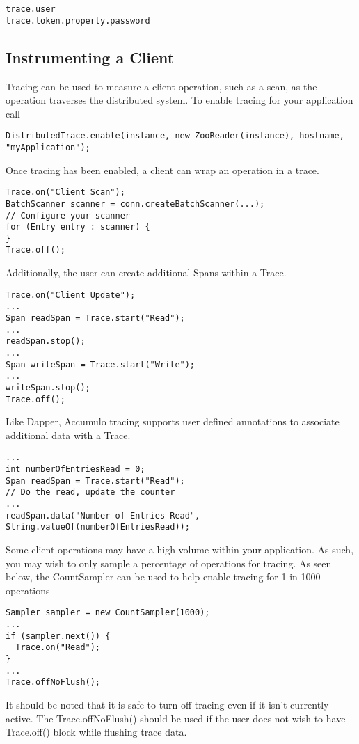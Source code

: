 \begin{verbatim}
trace.user
trace.token.property.password
\end{verbatim}

\subsection{Instrumenting a Client}
Tracing can be used to measure a client operation, such as a scan, as
the operation traverses the distributed system. To enable tracing for
your application call

\begin{verbatim}
DistributedTrace.enable(instance, new ZooReader(instance), hostname, "myApplication");
\end{verbatim}

Once tracing has been enabled, a client can wrap an operation in a trace.

\begin{verbatim}
Trace.on("Client Scan");
BatchScanner scanner = conn.createBatchScanner(...);
// Configure your scanner
for (Entry entry : scanner) {
}
Trace.off();
\end{verbatim}

Additionally, the user can create additional Spans within a Trace.
\begin{verbatim}
Trace.on("Client Update");
...
Span readSpan = Trace.start("Read");
...
readSpan.stop();
...
Span writeSpan = Trace.start("Write");
...
writeSpan.stop();
Trace.off();
\end{verbatim}

Like Dapper, Accumulo tracing supports user defined annotations to associate additional data with a Trace.
\begin{verbatim}
...
int numberOfEntriesRead = 0;
Span readSpan = Trace.start("Read");
// Do the read, update the counter
...
readSpan.data("Number of Entries Read", String.valueOf(numberOfEntriesRead));
\end{verbatim}

Some client operations may have a high volume within your
application. As such, you may wish to only sample a percentage of
operations for tracing. As seen below, the CountSampler can be used to
help enable tracing for 1-in-1000 operations
\begin{verbatim}
Sampler sampler = new CountSampler(1000);
...
if (sampler.next()) {
  Trace.on("Read");
}
...
Trace.offNoFlush();
\end{verbatim}

It should be noted that it is safe to turn off tracing even if it
isn't currently active. The Trace.offNoFlush() should be used if the
user does not wish to have Trace.off() block while flushing trace
data.

